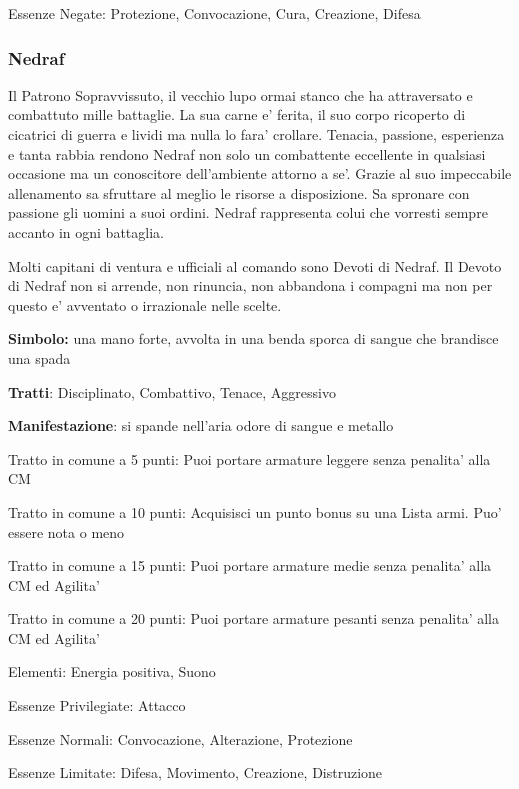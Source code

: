 \documentclass[a4paper,11pt,twoside,openany]{book}
\begin{document}
{Essenze Negate: Protezione, Convocazione, Cura, Creazione, Difesa

\subsubsection{Nedraf}

\label{nedraf}

Il Patrono Sopravvissuto, il vecchio lupo ormai stanco che ha attraversato e combattuto mille battaglie. La sua carne e' ferita, il suo corpo ricoperto di cicatrici di guerra e lividi ma nulla lo fara' crollare. Tenacia, passione, esperienza e tanta rabbia rendono Nedraf non solo un combattente eccellente in qualsiasi occasione ma un conoscitore dell'ambiente attorno a se'. Grazie al suo impeccabile allenamento sa sfruttare al meglio le risorse a disposizione. Sa spronare con passione gli uomini a suoi ordini.
Nedraf rappresenta colui che vorresti sempre accanto in ogni battaglia. 

Molti capitani di ventura e ufficiali al comando sono Devoti di Nedraf. Il Devoto di Nedraf non si arrende, non rinuncia, non abbandona i compagni ma non per questo e' avventato o irrazionale nelle scelte.

\textbf{Simbolo:} una mano forte, avvolta in una benda sporca di sangue
che brandisce una spada

\textbf{Tratti}: Disciplinato, Combattivo, Tenace, Aggressivo

\textbf{Manifestazione}: si spande nell'aria odore di sangue e metallo

\bigskip

Tratto in comune a 5 punti: Puoi portare armature leggere senza penalita' alla CM

Tratto in comune a 10 punti: Acquisisci un punto bonus su una Lista armi. Puo' essere nota o meno

Tratto in comune a 15 punti: Puoi portare armature medie senza penalita' alla CM ed Agilita'

Tratto in comune a 20 punti: Puoi portare armature pesanti senza penalita' alla CM ed Agilita'

\bigskip

Elementi: Energia positiva, Suono

\bigskip

Essenze Privilegiate: Attacco

Essenze Normali: Convocazione, Alterazione, Protezione

Essenze Limitate: Difesa, Movimento, Creazione, Distruzione

}
\end{document}
